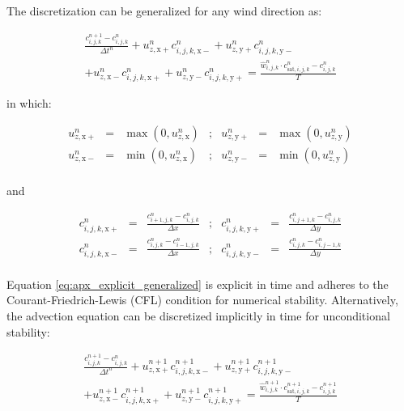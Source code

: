 The discretization can be generalized for any wind direction as:

\begin{multline}
  \label{eq:apx_explicit_generalized}
  \frac{c^{n+1}_{i,j,k} - c^n_{i,j,k}}{\Delta t^n} + 
  u^n_{z,\mathrm{x+}} c^n_{i,j,k,\mathrm{x-}} + 
  u^n_{z,\mathrm{y+}} c^n_{i,j,k,\mathrm{y-}} \\ +
  u^n_{z,\mathrm{x-}} c^n_{i,j,k,\mathrm{x+}} + 
  u^n_{z,\mathrm{y-}} c^n_{i,j,k,\mathrm{y+}} = 
  \frac{\hat{w}^n_{i,j,k} \cdot c^n_{\mathrm{sat},i,j,k} - c^n_{i,j,k}}{T}
\end{multline}

\noindent in which:

\begin{equation}
  \label{eq:apx_upwind1}
  \begin{array}{rclcrcl}
    u^n_{z,\mathrm{x+}} &=& \max( 0, u^n_{z,\mathrm{x}} ) &;& u^n_{z,\mathrm{y+}} &=& \max( 0, u^n_{z,\mathrm{y}} ) \\
    u^n_{z,\mathrm{x-}} &=& \min( 0, u^n_{z,\mathrm{x}} ) &;& u^n_{z,\mathrm{y-}} &=& \min( 0, u^n_{z,\mathrm{y}} ) \\
  \end{array}
\end{equation}

\noindent and 

\begin{equation}
  \label{eq:apx_upwind2}
  \begin{array}{rclcrcl}
    c^n_{i,j,k,\mathrm{x+}} &=& \frac{c^n_{i+1,j,k} - c^n_{i,j,k}}{\Delta x} &;&
        c^n_{i,j,k,\mathrm{y+}} &=& \frac{c^n_{i,j+1,k} - c^n_{i,j,k}}{\Delta y} \\
    c^n_{i,j,k,\mathrm{x-}} &=& \frac{c^n_{i,j,k} - c^n_{i-1,j,k}}{\Delta x} &;&
        c^n_{i,j,k,\mathrm{y-}} &=& \frac{c^n_{i,j,k} - c^n_{i,j-1,k}}{\Delta y} \\
  \end{array}
\end{equation}

\noindent Equation \ref{eq:apx_explicit_generalized} is explicit in
time and adheres to the Courant-Friedrich-Lewis (CFL) condition for
numerical stability. Alternatively, the advection equation can be
discretized implicitly in time for unconditional stability:

\begin{multline}
  \label{eq:apx_implicit_generalized}
  \frac{c^{n+1}_{i,j,k} - c^n_{i,j,k}}{\Delta t^n} + 
  u^{n+1}_{z,\mathrm{x+}} c^{n+1}_{i,j,k,\mathrm{x-}} + 
  u^{n+1}_{z,\mathrm{y+}} c^{n+1}_{i,j,k,\mathrm{y-}} \\ +
  u^{n+1}_{z,\mathrm{x-}} c^{n+1}_{i,j,k,\mathrm{x+}} + 
  u^{n+1}_{z,\mathrm{y-}} c^{n+1}_{i,j,k,\mathrm{y+}} =
  \frac{\hat{w}^{n+1}_{i,j,k} \cdot c^{n+1}_{\mathrm{sat},i,j,k} - c^{n+1}_{i,j,k}}{T}
\end{multline}

